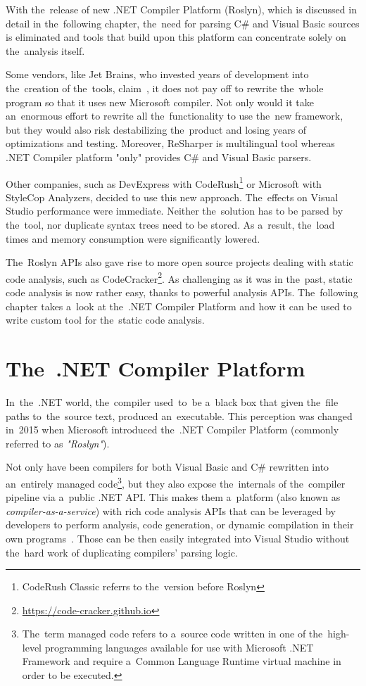 \documentclass[
  digital, %
  table,   %
  lof,     %
  lot,     %
  oneside,
]{fithesis3}
\begin{document}
With the~release of new .NET Compiler Platform (Roslyn), which is discussed in detail in the~following chapter, the~need for parsing C\# and Visual Basic sources is eliminated and tools that build upon this platform can concentrate solely on the~analysis itself.

Some vendors, like Jet Brains, who invested years of development into the~creation of the~tools, claim~\cite{resharper-and-roslyn-qa}, it does not pay off to rewrite the~whole program so that it uses new Microsoft compiler. Not only would it take an~enormous effort to rewrite all the~functionality to use the~new framework, but they would also risk destabilizing the~product and losing years of optimizations and testing. Moreover, ReSharper is multilingual tool whereas .NET Compiler platform "only" provides C\# and Visual Basic parsers.

Other companies, such as DevExpress with CodeRush\footnote{CodeRush Classic referrs to the~version before Roslyn} or Microsoft with StyleCop Analyzers, decided to use this new approach. The~effects on Visual Studio performance were immediate. Neither the~solution has to be parsed by the~tool, nor duplicate syntax trees need to be stored. As a~result, the~load times and memory consumption were significantly lowered.

The~Roslyn APIs also gave rise to more open source projects dealing with static code analysis, such as CodeCracker\footnote{\url{https://code-cracker.github.io}}. As challenging as it was in the~past, static code analysis is now rather easy, thanks to powerful analysis APIs. The~following chapter takes a~look at the~.NET Compiler Platform and how it can be used to write custom tool for the~static code analysis.

\chapter{The~.NET Compiler Platform}
In~the~.NET world, the~compiler used~to~be a~black box that given the~file paths to~the~source text, produced an~executable. This perception was changed in~2015 when Microsoft introduced the~.NET Compiler Platform (commonly referred to as \textit{"Roslyn"}).

Not only have been compilers for both Visual Basic and C\# rewritten into an~entirely managed code\footnote{The~term managed code refers to a~source code written in one of the~high-level programming languages available for use with Microsoft .NET Framework and require a~Common Language Runtime virtual machine in order to be executed.}, but they also expose the~internals of the~compiler pipeline via a~public .NET API. This makes them a~platform (also known as \textit{compiler-as-a-service}) with rich code analysis APIs that can be leveraged by developers to perform analysis, code generation, or dynamic compilation in their own programs~\cite{roslyn-succinctly}. Those can be then easily integrated into Visual Studio without the~hard work of duplicating compilers' parsing logic.
\end{document}
